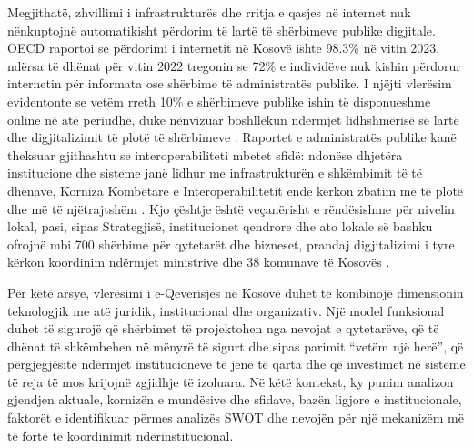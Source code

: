 \documentclass[conference]{IEEEtran}
\begin{document}
Megjithatë, zhvillimi i infrastrukturës dhe rritja e qasjes në internet nuk nënkuptojnë automatikisht përdorim të lartë të shërbimeve publike digjitale. OECD raportoi se përdorimi i internetit në Kosovë ishte 98.3\% në vitin 2023, ndërsa të dhënat për vitin 2022 tregonin se 72\% e individëve nuk kishin përdorur internetin për informata ose shërbime të administratës publike. I njëjti vlerësim evidentonte se vetëm rreth 10\% e shërbimeve publike ishin të disponueshme online në atë periudhë, duke nënvizuar boshllëkun ndërmjet lidhshmërisë së lartë dhe digjitalizimit të plotë të shërbimeve \cite{r4,r6}. Raportet e administratës publike kanë theksuar gjithashtu se interoperabiliteti mbetet sfidë: ndonëse dhjetëra institucione dhe sisteme janë lidhur me infrastrukturën e shkëmbimit të të dhënave, Korniza Kombëtare e Interoperabilitetit ende kërkon zbatim më të plotë dhe më të njëtrajtshëm \cite{r7}. Kjo çështje është veçanërisht e rëndësishme për nivelin lokal, pasi, sipas Strategjisë, institucionet qendrore dhe ato lokale së bashku ofrojnë mbi 700 shërbime për qytetarët dhe bizneset, prandaj digjitalizimi i tyre kërkon koordinim ndërmjet ministrive dhe 38 komunave të Kosovës \cite{r4}.

Për këtë arsye, vlerësimi i e-Qeverisjes në Kosovë duhet të kombinojë dimensionin teknologjik me atë juridik, institucional dhe organizativ. Një model funksional duhet të sigurojë që shërbimet të projektohen nga nevojat e qytetarëve, që të dhënat të shkëmbehen në mënyrë të sigurt dhe sipas parimit “vetëm një herë”, që përgjegjësitë ndërmjet institucioneve të jenë të qarta dhe që investimet në sisteme të reja të mos krijojnë zgjidhje të izoluara. Në këtë kontekst, ky punim analizon gjendjen aktuale, kornizën e mundësive dhe sfidave, bazën ligjore e institucionale, faktorët e identifikuar përmes analizës SWOT dhe nevojën për një mekanizëm më të fortë të koordinimit ndërinstitucional.
\end{document}
